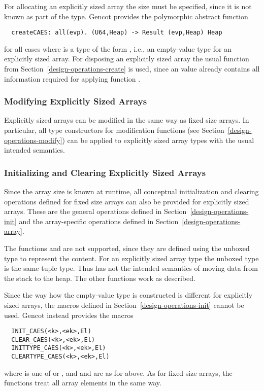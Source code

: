 For allocating an explicitly sized array the size must be specified, since it is not known as part of the type.
Gencot provides the polymorphic abstract function
\begin{verbatim}
  createCAES: all(evp). (U64,Heap) -> Result (evp,Heap) Heap
\end{verbatim}
for all cases where  is a type of the form , i.e., an empty-value type for an explicitly
sized array. For disposing an explicitly sized array the usual function  from Section~\ref{design-operations-create}
is used, since an  value already contains all information required for applying function .

\subsubsection{Modifying Explicitly Sized Arrays}

Explicitly sized arrays can be modified in the same way as fixed size arrays. In particular, 
all type constructors for modification functions (see Section~\ref{design-operations-modify}) can be applied to 
explicitly sized array types with the usual intended semantics. 

\subsubsection{Initializing and Clearing Explicitly Sized Arrays}

Since the array size is known at runtime, all conceptual initialization and clearing operations defined for fixed
size arrays can also be provided for explicitly sized arrays. These are the general operations defined in 
Section~\ref{design-operations-init} and the array-specific operations defined in Section~\ref{design-operations-array}.

The functions  and  are not supported, since they are defined using the unboxed type 
to represent the content. For an explicitly sized array type the unboxed type is the same tuple type. Thus  has not the
intended semantics of moving data from the stack to the heap. The other functions work as described.

Since the way how the empty-value type is constructed is different for explicitly sized arrays, the macros defined in
Section~\ref{design-operations-init} cannot be used. Gencot instead provides the macros
\begin{verbatim}
  INIT_CAES(<k>,<ek>,El)
  CLEAR_CAES(<k>,<ek>,El)
  INITTYPE_CAES(<k>,<ek>,El)
  CLEARTYPE_CAES(<k>,<ek>,El)
\end{verbatim}
where  is one of  or , and  and  are as for  above. As for fixed size
arrays, the functions treat all array elements in the same way.

